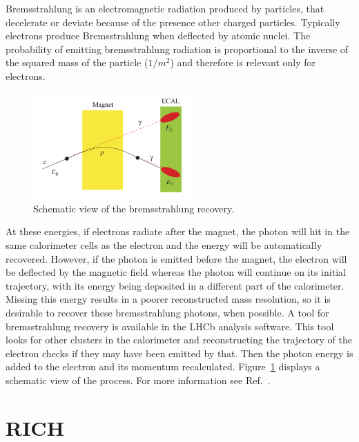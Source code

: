 Bremsstrahlung is an electromagnetic radiation produced by particles, that decelerate or deviate because of
the presence other charged particles. Typically electrons produce Bremsstrahlung when deflected by atomic nuclei.
The probability of emitting bremsstrahlung radiation is proportional to the inverse of the squared mass of the
particle ($1/m^2$) and therefore is relevant only for electrons.
%
\begin{figure}[h!]
\centering
\includegraphics[width=0.55\textwidth]{RKst/figs/brem_recovery.png}
\caption{Schematic view of the bremsstrahlung recovery. }
\label{fig:bremreco}
\end{figure}
%
At these energies, if electrons radiate after
the magnet, the photon will hit in the same calorimeter cells as the electron and the energy will be automatically
recovered. However, if the photon is emitted before the magnet, the electron will be deflected by the magnetic
field whereas the photon will continue on its initial trajectory, with its energy being deposited in a different
part of the calorimeter. Missing this energy results in a poorer reconstructed \Bz mass resolution, so it is
desirable to recover these bremsstrahlung photons, when possible. A tool for bremsstrahlung recovery is available
in the LHCb analysis software. This tool looks for other clusters in the calorimeter and reconstructing the trajectory
of the electron checks if they may have been emitted by that. Then the photon energy is added to the electron and its
momentum recalculated. Figure~\ref{fig:bremreco} displays a schematic view of the process. 
For more information see Ref.~\cite{LHCb:2003ab}.

\section{RICH}

